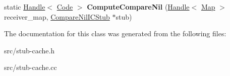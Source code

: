 \begin{DoxyCompactItemize}
\item 
\hypertarget{classv8_1_1internal_1_1_property_i_c_compiler_aa73405bd30b7699eb0d3bba91df8b366}{}static \hyperlink{classv8_1_1internal_1_1_handle}{Handle}$<$ \hyperlink{classv8_1_1internal_1_1_code}{Code} $>$ {\bfseries Compute\+Compare\+Nil} (\hyperlink{classv8_1_1internal_1_1_handle}{Handle}$<$ \hyperlink{classv8_1_1internal_1_1_map}{Map} $>$ receiver\+\_\+map, \hyperlink{classv8_1_1internal_1_1_compare_nil_i_c_stub}{Compare\+Nil\+I\+C\+Stub} $\ast$stub)\label{classv8_1_1internal_1_1_property_i_c_compiler_aa73405bd30b7699eb0d3bba91df8b366}

\end{DoxyCompactItemize}


The documentation for this class was generated from the following files\+:\begin{DoxyCompactItemize}
\item 
src/stub-\/cache.\+h\item 
src/stub-\/cache.\+cc\end{DoxyCompactItemize}
